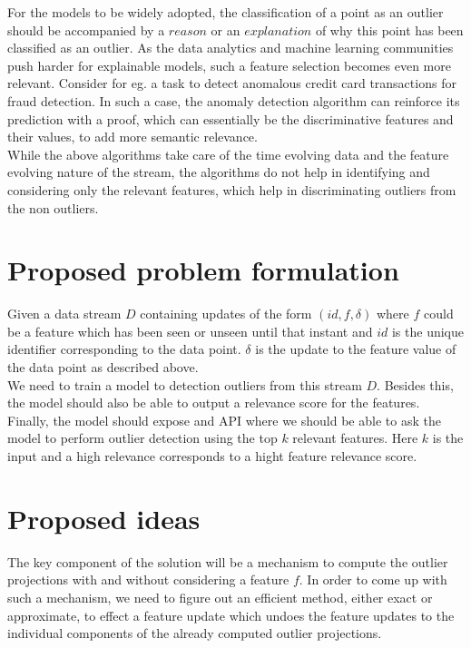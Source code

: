 For the models to be widely adopted, the classification of a point as an outlier should be accompanied by a $reason$ or an $explanation$ of why this point has been classified as an outlier. As the data analytics and machine learning communities push harder for explainable models, such a feature selection becomes even more relevant. Consider for eg. a task to detect anomalous credit card transactions for fraud detection. In such a case, the anomaly detection algorithm can reinforce its prediction with a proof, which can essentially be the discriminative features and their values, to add more semantic relevance. \\

While the above algorithms take care of the time evolving data and the feature evolving nature of the stream, the algorithms do not help in identifying and considering only the relevant features, which help in discriminating outliers from the non outliers. 

\section{Proposed problem formulation}

Given a data stream $D$ containing updates of the form $(id, f, \delta)$ where $f$ could be a feature which has been seen or unseen until that instant and $id$ is the unique identifier corresponding to the data point. $\delta$ is the update to the feature value of the data point as described above. \\

We need to train a model to detection outliers from this stream $D$. Besides this, the model should also be able to output a relevance score for the features. Finally, the model should expose and API where we should be able to ask the model to perform outlier detection using the top $k$ relevant features. Here $k$ is the input and a high relevance corresponds to a hight feature relevance score.

\section{Proposed ideas}

The key component of the solution will be a mechanism to compute the outlier projections with and without considering a feature $f$. In order to come up with such a mechanism, we need to figure out an efficient method, either exact or approximate, to effect a feature update which undoes the feature updates to the individual components of the already computed outlier projections. \\

